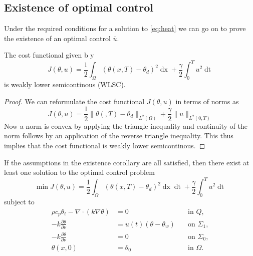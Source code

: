 \subsection{Existence of optimal control}
Under the required conditions for a solution to \eqref{eq:heat} we can go on to prove the existence of an optimal control $\bar{u}$. 

\begin{lemma}[WLSC]
    The cost functional given b y
    \begin{equation*}
         J(\theta, u) = \frac{1}{2} \int_\Omega (\theta(x, T) - \theta_d)^2 \mathop{dx} + \frac{\gamma}{2} \int_0^{T} u^2 \mathop{dt}
    \end{equation*}
    is weakly lower semicontinous (WLSC). 
\end{lemma}

\begin{proof}
We can reformulate the cost functional $J(\theta, u)$ in terms of norms as 
\begin{equation*}
    J(\theta, u) = \frac{1}{2}\|\theta (,T) - \theta_d \|_{L^2(\Omega)} + \frac{\gamma}{2}\|u\|_{L^2(0,T)}
\end{equation*}
Now a norm is convex by applying the triangle inequality and continuity of the norm follows by an application of the reverse triangle inequality. This thus implies that the cost functional is weakly lower semicontinous. 
\end{proof}

\begin{theorem}
If the assumptions in the existence corollary are all satisfied, then there exist at least one solution to the optimal control problem 
\begin{equation*}
       \min J(\theta, u) = \frac{1}{2} \int_\Omega (\theta(x, T) - \theta_d)^2 \mathop{dx} \mathop{dt} + \frac{\gamma}{2} \int_0^{T} u^2 \mathop{dt}
\end{equation*}
subject to
\begin{align*}
       \rho c_p \theta_t - \nabla \cdot (k \nabla \theta) &= 0 \quad &\text{in } Q,  \\
      -k \frac{\partial \theta}{\partial \nu} &= u(t) (\theta - \theta_w) \quad &\text{on } \Sigma_1, \\
      -k \frac{\partial \theta}{\partial \nu} &= 0 \quad &\text{on } \Sigma_0, \\
      \theta(x, 0) &= \theta_0 & \text{in $\Omega$.}
\end{align*}
\end{theorem}

